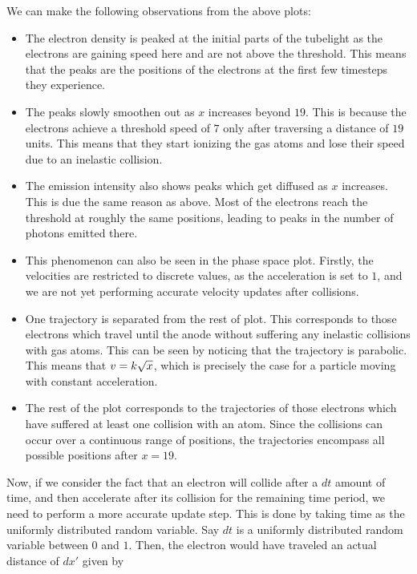 \documentclass[11pt]{article}
\begin{document}
	
		
    We can make the following observations from the above plots:

\begin{itemize}
\item
  The electron density is peaked at the initial parts of the tubelight
  as the electrons are gaining speed here and are not above the
  threshold. This means that the peaks are the positions of the
  electrons at the first few timesteps they experience.
\item
  The peaks slowly smoothen out as \(x\) increases beyond \(19\). This
  is because the electrons achieve a threshold speed of \(7\) only after
  traversing a distance of \(19\) units. This means that they start
  ionizing the gas atoms and lose their speed due to an inelastic
  collision.
\item
  The emission intensity also shows peaks which get diffused as \(x\)
  increases. This is due the same reason as above. Most of the electrons
  reach the threshold at roughly the same positions, leading to peaks in
  the number of photons emitted there.
\item
  This phenomenon can also be seen in the phase space plot. Firstly, the
  velocities are restricted to discrete values, as the acceleration is
  set to \(1\), and we are not yet performing accurate velocity updates
  after collisions.
\item
  One trajectory is separated from the rest of plot. This corresponds to
  those electrons which travel until the anode without suffering any
  inelastic collisions with gas atoms. This can be seen by noticing that
  the trajectory is parabolic. This means that
  \(v \space = k \sqrt{x}\), which is precisely the case for a particle
  moving with constant acceleration.
\item
  The rest of the plot corresponds to the trajectories of those
  electrons which have suffered at least one collision with an atom.
  Since the collisions can occur over a continuous range of positions,
  the trajectories encompass all possible positions after \(x=19\).
\end{itemize}

Now, if we consider the fact that an electron will collide after a
\(dt\) amount of time, and then accelerate after its collision for the
remaining time period, we need to perform a more accurate update step.
This is done by taking time as the uniformly distributed random
variable. Say \(dt\) is a uniformly distributed random variable between
\(0\) and \(1\). Then, the electron would have traveled an actual
distance of \(dx'\) given by
\end{document}
